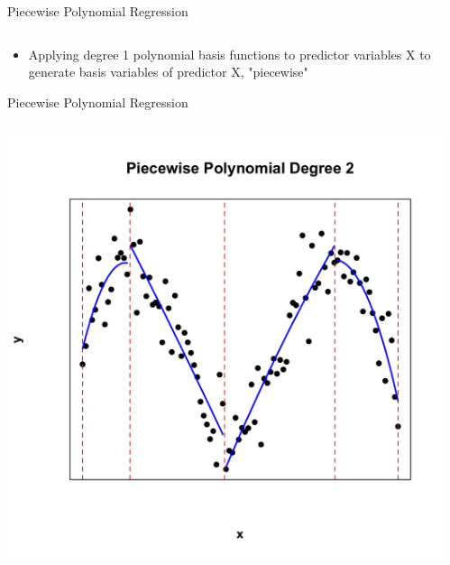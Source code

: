 \documentclass[english]{beamer}
\newcommand{\alertblue}[1]{{\color{blue}#1}}
\begin{document}
\begin{frame}{Piecewise Polynomial Regression}
\begin{columns}
\begin{column}{0.5\textwidth}
          \end{column}      
    \end{columns}
    \begin{itemize}
        \item Applying \alertblue{degree 1 polynomial basis functions} to predictor variables X to generate \alertblue{basis variables of predictor X}, "\alertblue{piecewise}"
    \end{itemize}
\end{frame}
\begin{frame}{Piecewise Polynomial Regression}
    
    \begin{columns}
        \begin{column}{0.47\textwidth}
            \centering
            \includegraphics[width=\linewidth]{images/piecewise_degree_2.jpeg} 
        \end{column}
        \begin{column}{0.47\textwidth}
            \centering

\end{column}
\end{columns}
\end{frame}
\end{document}
